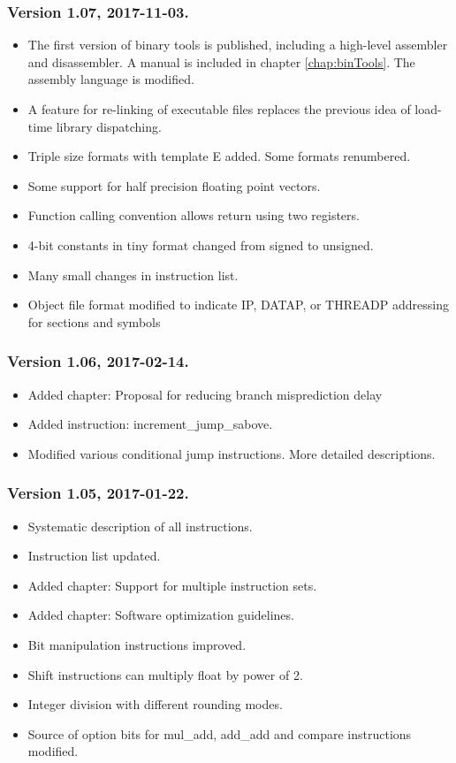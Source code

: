 \documentclass[forwardcom.tex]{subfiles}
\begin{document}
\subsubsection{Version 1.07, 2017-11-03.}
\begin{itemize}
\item The first version of binary tools is published, including a high-level assembler and disassembler. A manual is included in chapter \ref{chap:binTools}. The assembly language is modified.
\item A feature for re-linking of executable files replaces the previous idea of load-time library dispatching.
\item Triple size formats with template E added. Some formats renumbered.
\item Some support for half precision floating point vectors.
\item Function calling convention allows return using two registers.
\item 4-bit constants in tiny format changed from signed to unsigned.
\item Many small changes in instruction list.
\item Object file format modified to indicate IP, DATAP, or THREADP addressing for sections and symbols
\end{itemize}


\subsubsection{Version 1.06, 2017-02-14.}
\begin{itemize}
\item Added chapter: Proposal for reducing branch misprediction delay
\item Added instruction: increment\_jump\_sabove.
\item Modified various conditional jump instructions. More detailed descriptions.
\end{itemize}


\subsubsection{Version 1.05, 2017-01-22.}
\begin{itemize}
\item Systematic description of all instructions.
\item Instruction list updated.
\item Added chapter: Support for multiple instruction sets.
\item Added chapter: Software optimization guidelines.
\item Bit manipulation instructions improved.
\item Shift instructions can multiply float by power of 2.
\item Integer division with different rounding modes.
\item Source of option bits for mul\_add, add\_add and compare instructions modified.
\end{itemize}
\end{document}
